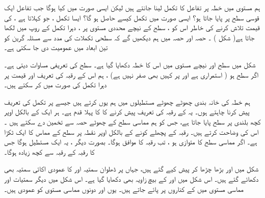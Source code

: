ہم مستوی  میں   خطہ پر تفاعل کا تکمل لینا جانتے ہیں لیکن ایسی صورت میں کیا ہوگا جب تفاعل ایک قوسی سطح پر پایا جاتا ہو؟    ایسی صورت میں تکمل کیسے حاصل  ہو گا؟ ایسا تکمل  ، جو کہلاتا ہے ، کی قیمت تلاش کرنے کی خاطر      اس کو ، سطح کے نیچے محددی مستوی  پر  ، دہرا تکمل  کے روپ میں لکھا جاتا ہے( شکل  ) ۔ حصہ   اور حصہ  میں ہم دیکھیں گے کہ سطحی تکملات کی مدد سے مسئلہ گرین کو تین ابعاد میں عمومیت دی جا سکتی ہے۔ 

 شکل   میں سطح   اور   نیچے مستوی میں  اس کا   خطہ   دکھایا گیا ہے۔ سطح کی تعریفی مساوات    دیتی  ہے۔اگر سطح    ہو   ( استمراری ہے اور پر کہیں بھی صفر نہیں ہے) ، ہم اس کے رقبہ کی تعریف اور قیمت پر دہرا تکمل کی صورت میں کر سکتے ہیں۔ 
 
 ہم  خطہ کی خانہ بندی چھوٹے چھوٹے مستطیلوں   میں ہم  یوں  کرتے ہیں  جیسے  پر تکمل کی تعریف پیش کرنا چاہتے ہوں۔ یہ کے رقبہ کی تعریف پیش کرنے کا کا پہلا قدم ہے۔ ہر ایک کے بالکل اوپر کچھ بلندی پر سطح پایا جاتا ہے،  جس کو ہم  مماسی سطح کے چھوٹے حصہ سے تخمین دے سکتے ہیں ۔ اس کی  وضاحت کرتے ہیں۔ رقبہ کے پچھلے کونے کے بالکل اوپر نقطہ پر سطح کے مماس کا ایک ٹکڑا ہے۔ اگر مماسی سطح کا متوازی ہو ، تب رقبہ کا  موافق  ہوگا۔  بصورت دیگر ، یہ ایک مستطیل ہوگا جس کا رقبہ کے رقبہ سے کچھ زیادہ ہوگا۔ 
 
  شکل  میں اور  بڑھا چڑھا کر پیش کیے گئے  ہیں،   جہاں پر ڈھلوان سمتیہ
   اور کا عمودی اکائی سمتیہ بھی  دکھائے گئے ہیں۔ اس شکل میں اور کے   بیچ  زاویہ بھی دکھایا گیا ہے۔ اس شکل میں دیگر سمتیات اور مماسی مستوی میں کے کناروں پر پائے جاتے ہیں۔ یوں اور دونوں مماسی مستوی کو عمودی ہیں۔
  
